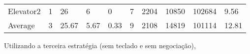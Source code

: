 \documentclass[a4paper]{article}
\begin{document}
\begin{table}[h]
\begin{tabular}{@{}llllllllll@{}}
Elevator2 & 1        & 26            & 6           & 0                                                               & 7                                                                  & 2204                                                         & 10850                                                 & 102684                                                   & 9.56         \\
Average   & 3     & 25.67         & 5.67        & 0.33                                                               & 9                                                               & 2108                                                         & 14819                                                 & 101114                                                   &  12.81         \\ \bottomrule
\end{tabular}
\end{table}

Utilizando a terceira estratégia (sem teclado e sem negociação),
\end{document}
